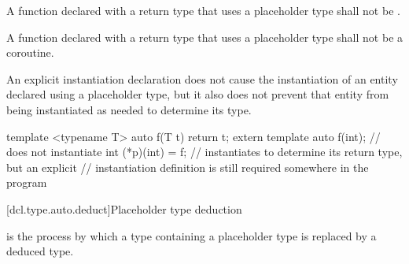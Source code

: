 \pnum
A function declared with a return type that uses a placeholder type shall not
be .

\pnum
A function declared with a return type that uses a placeholder type shall not
be a coroutine.

\pnum
An explicit instantiation declaration does not cause the
instantiation of an entity declared using a placeholder type, but it also does
not prevent that entity from being instantiated as needed to determine its
type.
\begin{example}
\begin{codeblock}
template <typename T> auto f(T t) { return t; }
extern template auto f(int);    // does not instantiate 
int (*p)(int) = f;              // instantiates  to determine its return type, but an explicit
                                // instantiation definition is still required somewhere in the program
\end{codeblock}
\end{example}

[dcl.type.auto.deduct]{Placeholder type deduction}
%

\pnum
{}
is the process by which
a type containing a placeholder type
is replaced by a deduced type.

